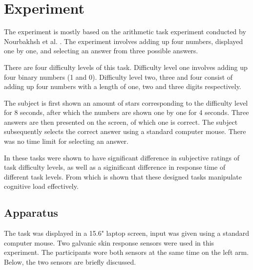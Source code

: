 \documentclass[11pt,leqno,a4paper]{report} %
\begin{document}
\section{Experiment}
The experiment is mostly based on the arithmetic task experiment conducted by Nourbakhsh et al. \citep{Nourbakhsh2012}. The experiment involves adding up four numbers, displayed one by one, and selecting an answer from three possible answers.

There are four difficulty levels of this task. Difficulty level one involves adding up four binary numbers (1 and 0). Difficulty level two, three and four consist of adding up  four numbers with a length of one, two and three digits respectively.

The subject is first shown an amount of stars corresponding to the difficulty level for 8 seconds, after which the numbers are shown one by one for 4 seconds. Three answers are then presented on the screen, of which one is correct. The subject subsequently selects the correct answer using a standard computer mouse. There was no time limit for selecting an answer.

In \citep{Nourbakhsh2013} these tasks were shown to have significant difference in subjective ratings of task difficulty levels, as well as a siginificant difference in response time of different task levels. From which is shown that these designed tasks manipulate cognitive load effectively.


\subsection{Apparatus}
The task was displayed in a 15.6" laptop screen, input was given using a standard computer mouse.
Two galvanic skin response sensors were used in this experiment. The participants wore both sensors at the same time on the left arm. Below, the two sensors are briefly discussed.
\end{document}
